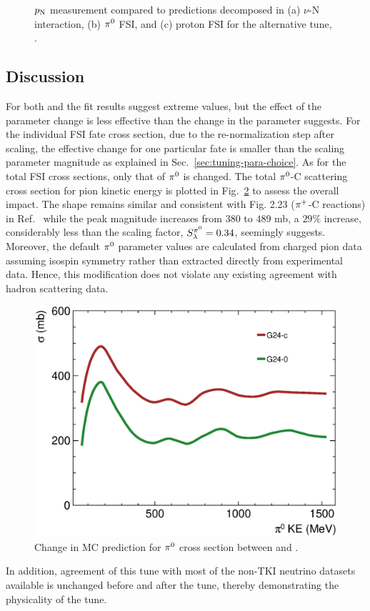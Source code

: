 \begin{figure}[!htb]
    \caption{\label{fig:minpiz-alttune} \minpiz $p_\textrm{N}$ measurement compared to \genie predictions decomposed in  (a) $\nu$-N interaction, (b) $\pi^0$ FSI, and (c) proton FSI for the alternative tune, \gT.} 
\end{figure}


\subsection{Discussion}
For both \gC and \gT the fit results suggest extreme values, but the effect of the parameter change is less effective than the change in the parameter suggests. 
For the individual FSI fate cross section, due to the re-normalization step after scaling, the effective change for one particular fate is smaller than the scaling parameter magnitude as explained in Sec.~\ref{sec:tuning-para-choice}. 
As for the total FSI cross sections, only that of $\pi^0$ is changed. The total $\pi^0$-C scattering cross section for pion kinetic energy is plotted in Fig.~\ref{fig:pizmfp_change} to assess the overall impact. 
The shape remains similar and consistent with Fig. 2.23 ($\pi^+$-C reactions) in Ref.~\cite{Andreopoulos:2015wxa} while the peak magnitude increases from $380$ to $489$ mb, a $29\%$ increase, considerably less than the scaling factor, $S_\lambda^{\pi^{0}}=0.34$, seemingly suggests. 
Moreover, the default $\pi^0$ parameter values are calculated from charged pion data assuming isospin symmetry rather than extracted directly from experimental data. 
Hence, this modification does not violate any existing agreement with hadron scattering data.
\begin{figure}[!htb] 	
    \centering 		
    \includegraphics[width=\sgfigwid\textwidth]{figures/tuning/pi0mfp_change_covfix.eps}
    \caption{\label{fig:pizmfp_change} Change in MC prediction for $\pi^0$ cross section between \gZero and \gC . } 
\end{figure}
In addition, agreement of this tune with most of the non-TKI neutrino datasets available is unchanged before and after the tune,  thereby demonstrating the physicality of the tune.

